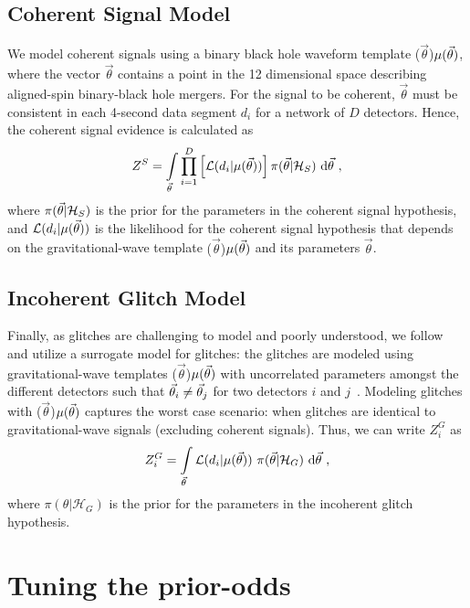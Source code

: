 \documentclass[%
 nofootinbib,
 amsmath,amssymb,
 aps,
 twocolumn,
 superscriptaddress
]{revtex4-2}
\newcommand{\mathcmd}[1]{{\sc \relax\ifmmode#1\else $#1$\fi}\xspace}
\newcommand{\parameters}{\mathcmd{\vec{\theta}}}
\newcommand{\template}{\mathcmd{\mu(\parameters)}}
\begin{document}
\subsection{Coherent Signal Model}
We model coherent signals using a binary black hole waveform template \template, where the vector \parameters contains a point in the 12 dimensional space describing aligned-spin binary-black hole mergers. For the signal to be coherent, \parameters must be consistent in each 4-second data segment $d_i$ for a network of $D$ detectors. Hence, the coherent signal evidence is calculated as
\begin{equation}
\label{eq:zs}
Z^S = \int\limits_{\parameters} \prod\limits^{D}_{i=1} \left[ \mathcal{L}(d_i|\template)\right] \pi(\parameters | \mathcal{H}_S)\  \text{d}\parameters \ ,
\end{equation}
where $\pi(\parameters| \mathcal{H}_S)$ is the prior for the parameters in the coherent signal hypothesis, and $\mathcal{L}(d_i|\template)$ is the likelihood for the coherent signal hypothesis that depends on the gravitational-wave template \template and its parameters \parameters. 

\subsection{Incoherent Glitch Model}
Finally, as glitches are challenging to model and poorly understood, we follow \citet{bci} and utilize a surrogate model for glitches: the glitches are modeled using gravitational-wave templates  \template with uncorrelated  parameters amongst the different detectors such that  $\parameters_i \neq \parameters_j$ for two detectors $i$ and $j$~\cite{bci}.  Modeling glitches with \template captures the worst case scenario: when glitches are identical to gravitational-wave signals (excluding coherent signals). Thus, we can write $Z^G_i$ as 
\begin{equation}
\label{eq:zg}
Z^G_i = \int\limits_{\parameters} \mathcal{L}(d_i|\template)\ \pi(\parameters| \mathcal{H}_G)\  \text{d}\parameters  \ ,
\end{equation}
where $\pi(\theta| \mathcal{H}_G)$ is the prior for the parameters in the incoherent glitch hypothesis. 



\section{Tuning the prior-odds}\label{apdx:tuning-prior-odds}
\end{document}
